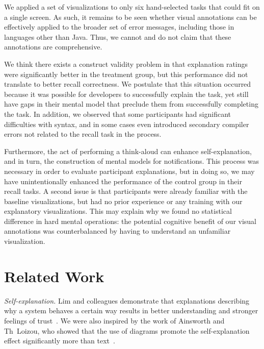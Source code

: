 \documentclass[conference]{IEEEtran}
\begin{document}
We applied a set of visualizations to only six hand-selected tasks that could fit on a single screen. As such, it remains to be seen whether visual annotations can be effectively applied to the broader set of error messages, including those in languages other than Java. Thus, we cannot and do not claim that these annotations are comprehensive.

We think there exists a construct validity problem in that explanation ratings were significantly better in the treatment group, but this performance did not translate to better recall correctness. We postulate that this situation occurred because it was possible for developers to successfully explain the task, yet still have gaps in their mental model that preclude them from successfully completing the task. In addition, we observed that some participants had significant difficulties with syntax, and in some cases even introduced secondary compiler errors not related to the recall task in the process.

Furthermore, the act of performing a think-aloud can enhance self-explanation, and in turn, the construction of mental models for notifications. This process was necessary in order to evaluate participant explanations, but in doing so, we may have unintentionally enhanced the performance of the control group in their recall tasks. A second issue is that participants were already familiar with the baseline visualizations, but had no prior experience or any training with our explanatory visualizations. This may explain why we found no statistical difference in hard mental operations: the potential cognitive benefit of our visual annotations was counterbalanced by having to understand an unfamiliar visualization.


\section{Related Work}

\textit{Self-explanation.} Lim and colleagues demonstrate that explanations describing why a system behaves a certain way results in better understanding and stronger feelings of trust~\cite{Lim2009}. We were also inspired by the work of Ainsworth and Th~Loizou, who showed that the use of diagrams promote the self-explanation effect significantly more than text~\cite{Ainsworth2003}.
\end{document}
